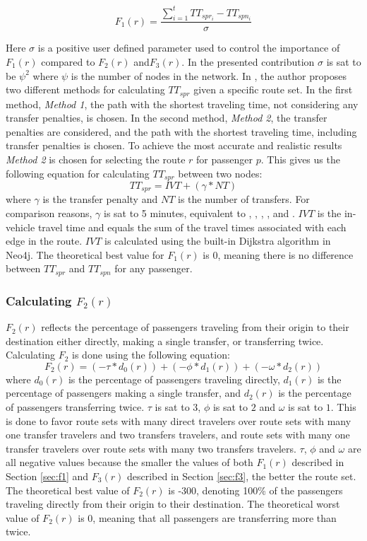 $$F_{1}(r) = \frac{\sum\limits^{t}_{i=1}TT_{spr_i}-TT_{spn_i}}{\sigma}$$

Here $\sigma$ is a positive user defined parameter used to control the importance of $F_{1}(r)$ compared to $F_{2}(r)$ and$F_{3}(r)$. In the presented contribution $\sigma$ is sat to be $\psi^2$ where $\psi$ is the number of nodes in the network. In \citet{mandl79}, the author proposes two different methods for calculating $TT_{spr}$ given a specific route set. In the first method, \textit{Method 1}, the path with the shortest traveling time, not considering any transfer penalties, is chosen. In the second method, \textit{Method 2}, the transfer penalties are considered, and the path with the shortest traveling time, including transfer penalties is chosen. To achieve the most accurate and realistic results \textit{Method 2} is chosen for selecting the route $r$ for passenger $p$. This gives us the following equation for calculating $TT_{spr}$ between two nodes: 
\newline
$$TT_{spr} = IVT + (\gamma*NT)$$
\newline
where $\gamma$ is the transfer penalty and $NT$ is the number of transfers. For comparison reasons, $\gamma$ is sat to 5 minutes, equivalent to \citet{kechagiopoulos14}, \citet{baaj91}, \citet{chakroborty02}, \citet{nikolic14}, \citet{fan10} and \citet{mandl79}. $IVT$ is the in-vehicle travel time and equals the sum of the travel times associated with each edge in the route. $IVT$ is calculated using the built-in Dijkstra algorithm in Neo4j. The theoretical best value for $F_{1}(r)$ is 0, meaning there is no difference between $TT_{spr}$ and $TT_{spn}$ for any passenger.

\subsubsection{Calculating $F_{2}(r)$}
\label{sec:f2}
$F_{2}(r)$ reflects the percentage of passengers traveling from their origin to their destination either directly, making a single transfer, or transferring twice. Calculating $F_{2}$ is done using the following equation: 
\newline
$$F_2(r) = (-\tau*d_0(r)) + (-\phi*d_1(r)) + (-\omega*d_2(r))$$
\newline
where $d_0(r)$ is the percentage of passengers traveling directly, $d_1(r)$ is the percentage of passengers making a single transfer, and $d_2(r)$ is the percentage of passengers transferring twice. $\tau$ is sat to $3$, $\phi$ is sat to $2$ and $\omega$ is sat to $1$. This is done to favor route sets with many direct travelers over route sets with many one transfer travelers and two transfers travelers, and route sets with many one transfer travelers over route sets with many two transfers travelers. $\tau$, $\phi$ and $\omega$ are all negative values because the smaller the values of both $F_{1}(r)$ described in Section \vref{sec:f1} and $F_{3}(r)$ described in Section \vref{sec:f3}, the better the route set. The theoretical best value of $F_{2}(r)$ is -300, denoting 100\% of the passengers traveling directly from their origin to their destination. The theoretical worst value of $F_{2}(r)$ is 0, meaning that all passengers are transferring more than twice. 

